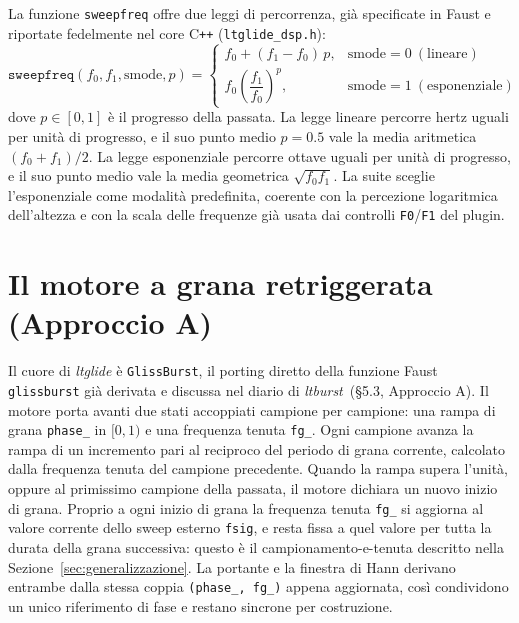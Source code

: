 \documentclass[11pt,a4paper]{article}
\begin{document}
La funzione \texttt{sweepfreq} offre due leggi di percorrenza, gi\`a specificate in Faust e riportate fedelmente nel core C\texttt{++} (\texttt{ltglide\_dsp.h}):
\begin{equation}
\texttt{sweepfreq}(f_0,f_1,\mathrm{smode},p) =
\begin{cases}
f_0 + (f_1-f_0)\,p, & \mathrm{smode}=0 \ (\text{lineare}) \\
f_0 \left(\dfrac{f_1}{f_0}\right)^{p}, & \mathrm{smode}=1 \ (\text{esponenziale})
\end{cases}
\end{equation}
dove $p \in [0,1]$ \`e il progresso della passata.
La legge lineare percorre hertz uguali per unit\`a di progresso, e il suo punto medio $p=0.5$ vale la media aritmetica $(f_0+f_1)/2$.
La legge esponenziale percorre ottave uguali per unit\`a di progresso, e il suo punto medio vale la media geometrica $\sqrt{f_0 f_1}$.
La suite sceglie l'esponenziale come modalit\`a predefinita, coerente con la percezione logaritmica dell'altezza e con la scala delle frequenze gi\`a usata dai controlli \texttt{F0}/\texttt{F1} del plugin.

\section{Il motore a grana retriggerata (Approccio A)}\label{sec:motore}

Il cuore di \emph{ltglide} \`e \texttt{GlissBurst}, il porting diretto della funzione Faust \texttt{glissburst} gi\`a derivata e discussa nel diario di \emph{ltburst}~(\S5.3, Approccio A).
Il motore porta avanti due stati accoppiati campione per campione: una rampa di grana \texttt{phase\_} in $[0,1)$ e una frequenza tenuta \texttt{fg\_}.
Ogni campione avanza la rampa di un incremento pari al reciproco del periodo di grana corrente, calcolato dalla frequenza tenuta del campione precedente.
Quando la rampa supera l'unit\`a, oppure al primissimo campione della passata, il motore dichiara un nuovo inizio di grana.
Proprio a ogni inizio di grana la frequenza tenuta \texttt{fg\_} si aggiorna al valore corrente dello sweep esterno \texttt{fsig}, e resta fissa a quel valore per tutta la durata della grana successiva: questo \`e il campionamento-e-tenuta descritto nella Sezione~\ref{sec:generalizzazione}.
La portante e la finestra di Hann derivano entrambe dalla stessa coppia \texttt{(phase\_, fg\_)} appena aggiornata, cos\`i condividono un unico riferimento di fase e restano sincrone per costruzione.
\end{document}

